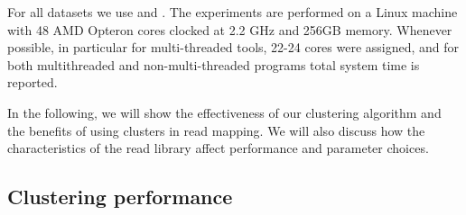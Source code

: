 \documentclass[a4paper]{article}
\begin{document}
For all datasets we use  and .
The experiments are performed on a Linux machine with 48 AMD
Opteron cores clocked at 2.2 GHz and 256GB
memory. Whenever possible, in particular for multi-threaded tools, 22-24
cores were assigned, and for both multithreaded and non-multi-threaded
programs total system time is reported.

In the following,
we will show the effectiveness
of our clustering algorithm and the benefits of using clusters
in read mapping. We will also discuss how the characteristics
of the read library affect performance and parameter choices.

\subsection{Clustering performance}
\end{document}
